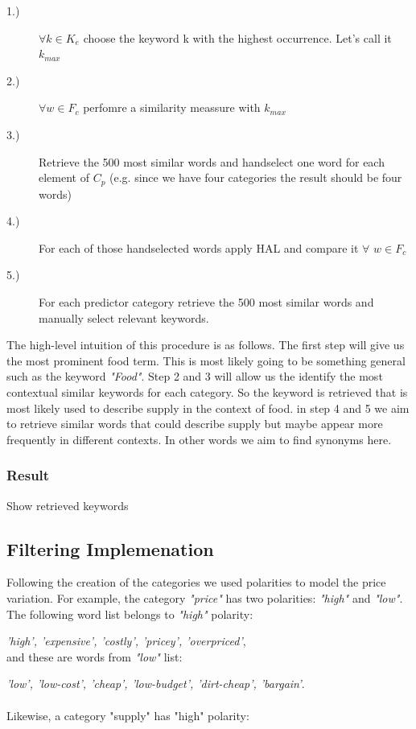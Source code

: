 \documentclass[12pt]{report}
\begin{document}
\begin{description}
  \item[1.)] $\forall k \in K_e$ choose the keyword k with the highest occurrence. Let's call it $k_{max}$  
  \item[2.)] $\forall w \in F_c $ perfomre a similarity meassure with $k_{max}$
  \item[3.)] Retrieve the 500 most similar words and handselect one word for each element of $C_p$ (e.g. since we have four categories the result should be four words)
  \item[4.)] For each of those handselected words  apply HAL and compare it $\forall$ $w \in F_c $
  \item[5.)] For each predictor category retrieve the 500 most similar words and manually select relevant keywords. 
  \end{description}

The high-level intuition of this procedure is as follows. The first step will give us the most prominent food term. This is most likely going to be something general such as the keyword \emph{"Food"}. Step 2 and 3 will allow us the identify the most contextual similar keywords for each category. So the keyword is retrieved that is most likely used to describe supply in the context of food. in step 4 and 5 we aim to retrieve similar words that could describe supply but maybe appear more frequently in different contexts. In other words we aim to find synonyms here.   

\subsubsection{Result}

Show retrieved keywords


\subsection{Filtering Implemenation}

Following the creation of the categories we used polarities to model the price variation. For example, the category \emph{"price"} has two polarities: \emph{"high"} and \emph{"low"}.
\\
The following word list belongs to \emph{"high"} polarity:

\emph{'high', 'expensive', 'costly', 'pricey', 'overpriced'},
\\
and these are words from \emph{"low"} list:

\emph{'low', 'low-cost', 'cheap', 'low-budget', 'dirt-cheap', 'bargain'}.
\\ \\
Likewise, a category "supply" has "high" polarity:
\end{document}
